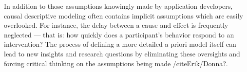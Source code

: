 \documentclass[runningheads,a4paper]{llncs}
\begin{document}
In addition to those assumptions knowingly made by application developers, causal descriptive modeling often contains implicit assumptions which are easily overlooked.
For instance, the delay between a cause and effect is frequently neglected --- that is: how quickly does a participant’s behavior respond to an intervention?
The process of defining a more detailed a priori model itself can lead to new insights and research questions by eliminating these oversights and forcing critical thinking on the assumptions being made /cite{Erik/Donna?}.


\end{document}
